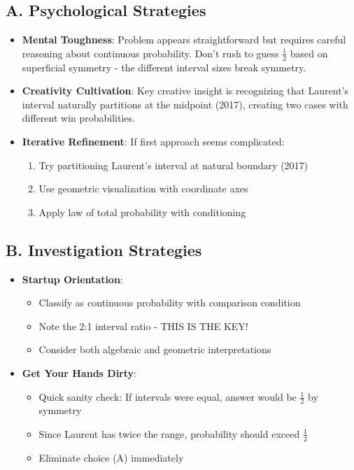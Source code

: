 \documentclass[]{article}
\begin{document}
\begin{strategicbox}
\subsection*{A. Psychological Strategies}
\begin{itemize}[leftmargin=*]
    \item \textbf{Mental Toughness}: Problem appears straightforward but requires careful reasoning about continuous probability. Don't rush to guess $\frac{1}{2}$ based on superficial symmetry - the different interval sizes break symmetry.
    
    \item \textbf{Creativity Cultivation}: Key creative insight is recognizing that Laurent's interval naturally partitions at the midpoint (2017), creating two cases with different win probabilities.
    
    \item \textbf{Iterative Refinement}: If first approach seems complicated:
    \begin{enumerate}
        \item Try partitioning Laurent's interval at natural boundary (2017)
        \item Use geometric visualization with coordinate axes
        \item Apply law of total probability with conditioning
    \end{enumerate}
\end{itemize}

\subsection*{B. Investigation Strategies}
\begin{itemize}[leftmargin=*]
    \item \textbf{Startup Orientation}: 
    \begin{itemize}
        \item Classify as continuous probability with comparison condition
        \item Note the 2:1 interval ratio - THIS IS THE KEY!
        \item Consider both algebraic and geometric interpretations
    \end{itemize}
    
    \item \textbf{Get Your Hands Dirty}: 
    \begin{itemize}
        \item Quick sanity check: If intervals were equal, answer would be $\frac{1}{2}$ by symmetry
        \item Since Laurent has twice the range, probability should exceed $\frac{1}{2}$
        \item Eliminate choice (A) immediately
    \end{itemize}
    

\end{itemize}
\end{strategicbox}
\end{document}
